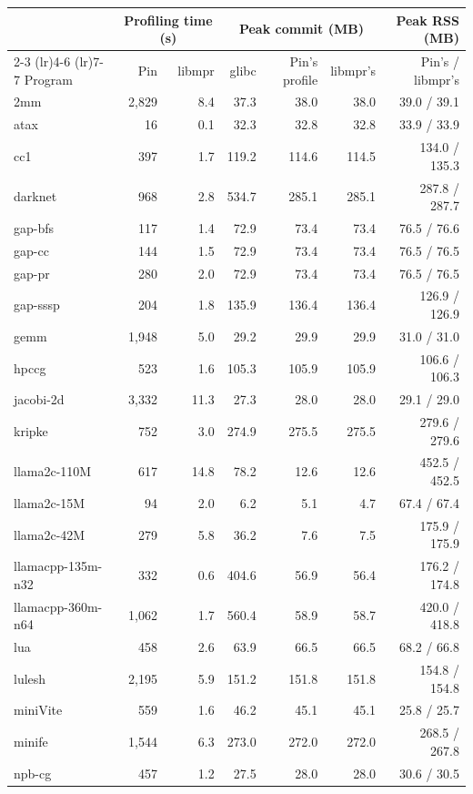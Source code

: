 \begin{tabular}{lrrrrrr}
\toprule
 & \multicolumn{2}{c}{Profiling time (s)} & \multicolumn{3}{c}{Peak commit (MB)} & Peak RSS (MB) \\
\cmidrule(lr){2-3} \cmidrule(lr){4-6} \cmidrule(lr){7-7}
Program & Pin & libmpr & glibc & Pin's profile & libmpr's & Pin's / libmpr's \\
\midrule
2mm & 2{,}829 & 8.4 & 37.3 & 38.0 & 38.0 & 39.0 / 39.1 \\
atax & 16 & 0.1 & 32.3 & 32.8 & 32.8 & 33.9 / 33.9 \\
cc1 & 397 & 1.7 & 119.2 & 114.6 & 114.5 & 134.0 / 135.3 \\
darknet & 968 & 2.8 & 534.7 & 285.1 & 285.1 & 287.8 / 287.7 \\
gap-bfs & 117 & 1.4 & 72.9 & 73.4 & 73.4 & 76.5 / 76.6 \\
gap-cc & 144 & 1.5 & 72.9 & 73.4 & 73.4 & 76.5 / 76.5 \\
gap-pr & 280 & 2.0 & 72.9 & 73.4 & 73.4 & 76.5 / 76.5 \\
gap-sssp & 204 & 1.8 & 135.9 & 136.4 & 136.4 & 126.9 / 126.9 \\
gemm & 1{,}948 & 5.0 & 29.2 & 29.9 & 29.9 & 31.0 / 31.0 \\
hpccg & 523 & 1.6 & 105.3 & 105.9 & 105.9 & 106.6 / 106.3 \\
jacobi-2d & 3{,}332 & 11.3 & 27.3 & 28.0 & 28.0 & 29.1 / 29.0 \\
kripke & 752 & 3.0 & 274.9 & 275.5 & 275.5 & 279.6 / 279.6 \\
llama2c-110M & 617 & 14.8 & 78.2 & 12.6 & 12.6 & 452.5 / 452.5 \\
llama2c-15M & 94 & 2.0 & 6.2 & 5.1 & 4.7 & 67.4 / 67.4 \\
llama2c-42M & 279 & 5.8 & 36.2 & 7.6 & 7.5 & 175.9 / 175.9 \\
llamacpp-135m-n32 & 332 & 0.6 & 404.6 & 56.9 & 56.4 & 176.2 / 174.8 \\
llamacpp-360m-n64 & 1{,}062 & 1.7 & 560.4 & 58.9 & 58.7 & 420.0 / 418.8 \\
lua & 458 & 2.6 & 63.9 & 66.5 & 66.5 & 68.2 / 66.8 \\
lulesh & 2{,}195 & 5.9 & 151.2 & 151.8 & 151.8 & 154.8 / 154.8 \\
miniVite & 559 & 1.6 & 46.2 & 45.1 & 45.1 & 25.8 / 25.7 \\
minife & 1{,}544 & 6.3 & 273.0 & 272.0 & 272.0 & 268.5 / 267.8 \\
npb-cg & 457 & 1.2 & 27.5 & 28.0 & 28.0 & 30.6 / 30.5 \\

\end{tabular}
